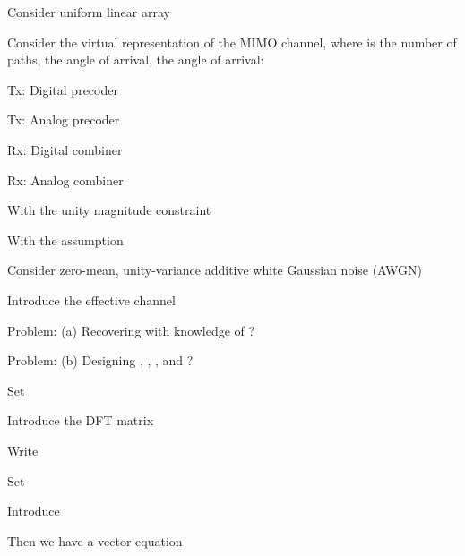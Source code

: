 {
\I Consider uniform linear array

\I Consider the virtual representation of the MIMO channel, where  is the number of paths,  the angle of arrival,  the angle of arrival:
}
{
\I Tx: Digital precoder 

\I Tx: Analog precoder 

\I Rx: Digital combiner 

\I Rx: Analog combiner 

\I With the unity magnitude constraint

\I With the assumption 
}
{
\I Consider zero-mean, unity-variance additive white Gaussian noise (AWGN) 

\I Introduce the effective channel

\I Problem: (a) Recovering  with knowledge of ?

\I Problem: (b) Designing , , , and ?
}
{
\I Set 

\I Introduce the DFT matrix 

\I Write 
}
{
\I Set 

\I Introduce

\I Then we have a vector equation
}
